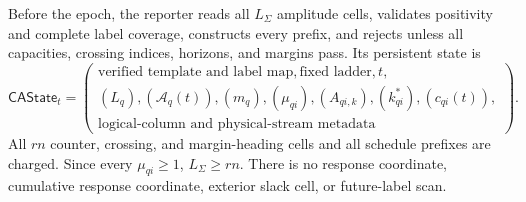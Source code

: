 \begin{theorem}
Before the epoch, the reporter reads all $L_\Sigma$ amplitude cells, validates
positivity and complete label coverage, constructs every prefix, and rejects
unless all capacities, crossing indices, horizons, and margins pass.  Its
persistent state is
\begin{equation}
 \mathsf{CAState}_t=\left(
 \begin{gathered}
  \text{verified template and label map},\text{fixed ladder},t,\\
  (L_q),(\mathcal A_q(t)),(m_q),(\mu_{qi}),(A_{qi,k}),
  (k_{qi}^*),(c_{qi}(t)),\\
  \text{logical-column and physical-stream metadata}
 \end{gathered}
 \right).
 \label{eq:notched-sun-columnwise-amplitude-reporter-state}
\end{equation}
All $rn$ counter, crossing, and margin-heading cells and all schedule prefixes
are charged.  Since every $\mu_{qi}\geq1$, $L_\Sigma\geq rn$.  There is no
response coordinate, cumulative response coordinate, exterior slack cell, or
future-label scan.


\end{theorem}
